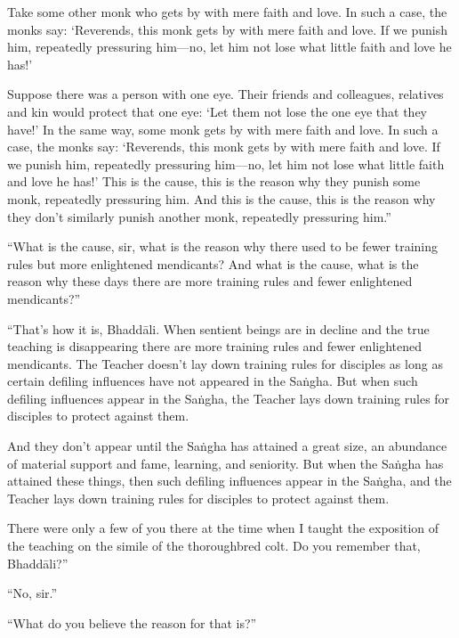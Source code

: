 \documentclass[12pt,openany]{book}%
\begin{document}
Take some other monk who gets by with mere faith and love. In such a case, the monks say: ‘Reverends, this monk gets by with mere faith and love. If we punish him, repeatedly pressuring him—no, let him not lose what little faith and love he has!’ 

Suppose there was a person with one eye. Their friends and colleagues, relatives and kin would protect that one eye: ‘Let them not lose the one eye that they have!’ In the same way, some monk gets by with mere faith and love. In such a case, the monks say: ‘Reverends, this monk gets by with mere faith and love. If we punish him, repeatedly pressuring him—no, let him not lose what little faith and love he has!’ This is the cause, this is the reason why they punish some monk, repeatedly pressuring him. And this is the cause, this is the reason why they don’t similarly punish another monk, repeatedly pressuring him.” 

“What is the cause, sir, what is the reason why there used to be fewer training rules but more enlightened mendicants? And what is the cause, what is the reason why these days there are more training rules and fewer enlightened mendicants?” 

“That’s how it is, \textsanskrit{Bhaddāli}. When sentient beings are in decline and the true teaching is disappearing there are more training rules and fewer enlightened mendicants. The Teacher doesn’t lay down training rules for disciples as long as certain defiling influences have not appeared in the \textsanskrit{Saṅgha}. But when such defiling influences appear in the \textsanskrit{Saṅgha}, the Teacher lays down training rules for disciples to protect against them. 

And they don’t appear until the \textsanskrit{Saṅgha} has attained a great size, an abundance of material support and fame, learning, and seniority. But when the \textsanskrit{Saṅgha} has attained these things, then such defiling influences appear in the \textsanskrit{Saṅgha}, and the Teacher lays down training rules for disciples to protect against them. 

There were only a few of you there at the time when I taught the exposition of the teaching on the simile of the thoroughbred colt. Do you remember that, \textsanskrit{Bhaddāli}?” 

“No, sir.” 

“What do you believe the reason for that is?” 
\end{document}
